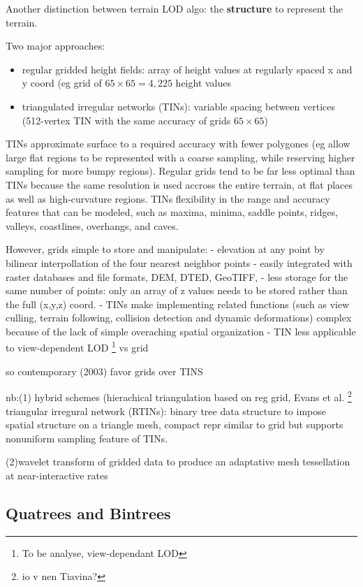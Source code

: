 \documentclass[11pt]{report}
\begin{document}
Another distinction between terrain LOD algo: the \textbf{structure} to represent the terrain.

Two major approaches:
\begin{itemize}
\item regular gridded height fields: array of height values at regularly spaced x and y coord (eg grid of $65 \times 65 = 4,225 $ height values
\item triangulated irregular networks (TINs): variable spacing between vertices (512-vertex TIN with the same accuracy of grids $65 \times 65$)
\end{itemize}


TINs approximate surface to a required accuracy with fewer polygones (eg allow large flat regions to be represented with a coarse sampling, while reserving higher sampling for more bumpy regions). Regular grids tend to be far less optimal than TINs because the same resolution is used accross the entire terrain, at flat places as well as high-curvature regions. TINs flexibility in the range and accuracy features that can be modeled, such as maxima, minima, saddle points, ridges, valleys, coastlines, overhangs, and caves.

 However, grids simple to store and manipulate:
 - elevation at any point by bilinear interpollation of the four nearest neighbor points
 - easily integrated with raster databases and file formats, DEM, DTED, GeoTIFF,
 - less storage for the same number of points: only an array of z values needs to be stored rather than the full (x,y,z) coord.
 - TINs make implementing related functions (such as view culling, terrain following, collision detection and dynamic deformations) complex because of the lack of simple overaching spatial organization
 - TIN less applicable to view-dependent LOD \footnote{To be analyse, view-dependant LOD} vs grid
 
 so contemporary (2003) favor grids over TINS
 
 nb:(1) hybrid schemes (hierachical triangulation based on reg grid, Evans et al. \footnote{io v nen Tiavina?} triangular irregural network (RTINs): binary tree data structure to impose spatial structure on a triangle mesh, compact repr similar to grid but supports nonuniform sampling feature of TINs. 

(2)wavelet transform of gridded data to produce an adaptative mesh tessellation at near-interactive rates

\subsection{Quatrees and Bintrees}
\end{document}
